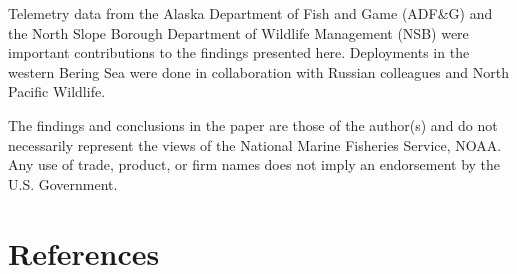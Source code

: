 \documentclass[fleqn,10pt,lineno]{wlpeerj} %
\begin{document}
Telemetry data from the Alaska Department of Fish and Game (ADF\&G) and the North
Slope Borough Department of Wildlife Management (NSB) were important
contributions to the findings presented here. Deployments in the western Bering
Sea were done in collaboration with Russian colleagues and North Pacific
Wildlife.

The findings and conclusions in the paper are those of the author(s) and do not
necessarily represent the views of the National Marine Fisheries Service, NOAA.
Any use of trade, product, or firm names does not imply an endorsement by the
U.S. Government.

\section*{References}\label{references}
\end{document}
